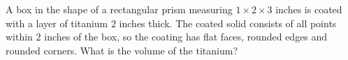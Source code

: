 A box in the shape of a rectangular prism measuring $1\times2\times3$ inches is coated with a layer of titanium $2$ inches thick. The coated solid consists of all points within $2$ inches of the box, so the coating has flat faces, rounded edges and rounded corners. What is the volume of the titanium?
